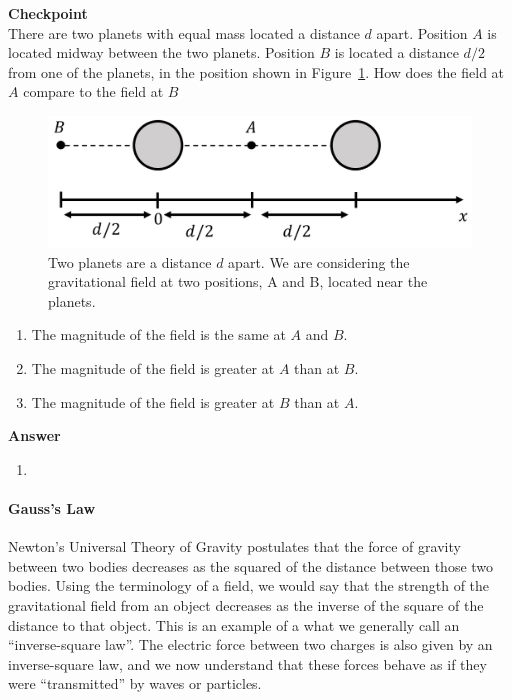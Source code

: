 \begin{framed}
\textbf{Checkpoint}\\
There are two planets with equal mass located a distance $d$ apart. Position $A$ is located midway between the two planets. Position $B$ is located a distance $d/2$ from one of the planets, in the position shown in Figure~\ref{fig:gravity:fieldAB}. How does the field at $A$ compare to the field at $B$

\begin{figure}[!htbp]
\centering
\includegraphics[width=0.6\linewidth]{files/fieldAB-8b5177e687c3f0a0914470d3ce9c2cde.png}
\caption[]{Two planets are a distance $d$ apart. We are considering the gravitational field at two positions, A and B, located near the planets.}
\label{fig:gravity:fieldAB}
\end{figure}

\begin{enumerate}
\item The magnitude of the field is the same at $A$ and $B$.
\item The magnitude of the field is greater at $A$ than at $B$.
\item The magnitude of the field is greater at $B$ than at $A$.
\end{enumerate}

\begin{framed}
\textbf{Answer}\\
\begin{enumerate}[resume]
\item
\end{enumerate}
\end{framed}
\end{framed}

\paragraph{Gauss's Law}\label{sec:gravity:gauss}

Newton's Universal Theory of Gravity postulates that the force of gravity between two bodies decreases as the squared of the distance between those two bodies. Using the terminology of a field, we would say that the strength of the gravitational field from an object decreases as the inverse of the square of the distance to that object. This is an example of a what we generally call an ``inverse-square law''. The electric force between two charges is also given by an inverse-square law, and we now understand that these forces behave as if they were ``transmitted'' by waves or particles.


